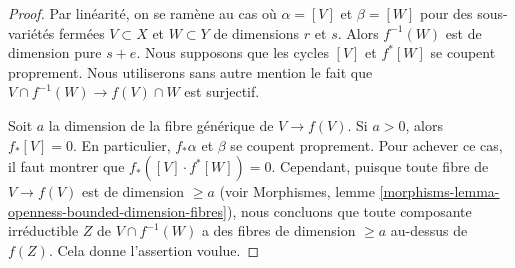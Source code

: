 \begin{proof}
Par linéarité, on se ramène au cas où $\alpha = [V]$ et
$\beta = [W]$ pour des sous-variétés fermées $V \subset X$ et
$W \subset Y$ de dimensions $r$ et $s$. Alors $f^{-1}(W)$ est de
dimension pure $s + e$. Nous supposons que les cycles
$[V]$ et $f^*[W]$ se coupent proprement. Nous utiliserons sans
autre mention le fait que $V \cap f^{-1}(W) \to f(V) \cap W$
est surjectif.

\medskip\noindent
Soit $a$ la dimension de la fibre générique de $V \to f(V)$.
Si $a > 0$, alors $f_*[V] = 0$. En particulier, $f_*\alpha$ et $\beta$
se coupent proprement. Pour achever ce cas, il faut montrer que
$f_*([V] \cdot f^*[W]) = 0$. Cependant, puisque toute fibre de
$V \to f(V)$ est de dimension $\geq a$ (voir
Morphismes, lemme \ref{morphisms-lemma-openness-bounded-dimension-fibres}),
nous concluons que toute composante irréductible $Z$ de $V \cap f^{-1}(W)$
a des fibres de dimension $\geq a$ au-dessus de $f(Z)$. Cela donne
l'assertion voulue.


\end{proof}
